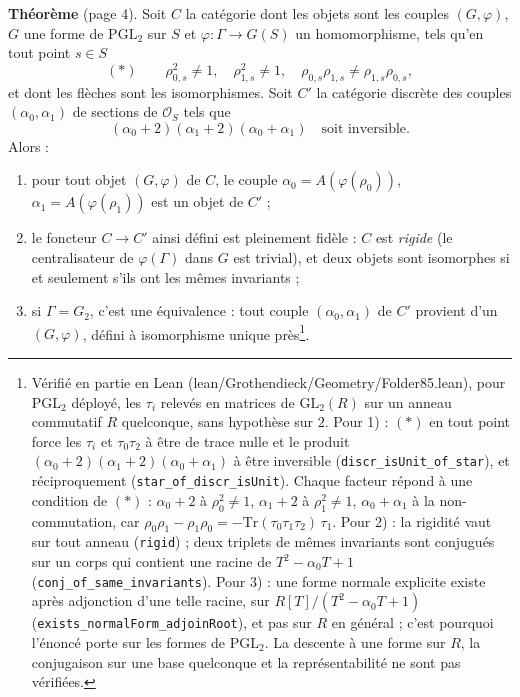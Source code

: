 \documentclass[11pt,a4paper]{article}
\begin{document}
\textbf{Théorème} (page 4). Soit $C$ la catégorie dont les objets sont les
couples $(G, \varphi)$, $G$ une forme de $\mathrm{PGL}_2$ sur $S$ et $\varphi
: \Gamma \to G(S)$ un homomorphisme, tels qu'en tout point $s \in S$
\[
  (*) \qquad \rho_{0,s}^2 \neq 1, \quad \rho_{1,s}^2 \neq 1, \quad
  \rho_{0,s}\rho_{1,s} \neq \rho_{1,s}\rho_{0,s},
\]
et dont les flèches sont les isomorphismes. Soit $C'$ la catégorie discrète
des couples $(\alpha_0, \alpha_1)$ de sections de $\mathcal{O}_S$ tels que
\[
  (\alpha_0 + 2)(\alpha_1 + 2)(\alpha_0 + \alpha_1) \quad \text{soit
  inversible.}
\]
Alors :
\begin{enumerate}
  \item pour tout objet $(G, \varphi)$ de $C$, le couple $\alpha_0 =
    A(\varphi(\rho_0))$, $\alpha_1 = A(\varphi(\rho_1))$ est un objet de $C'$ ;
  \item le foncteur $C \to C'$ ainsi défini est pleinement fidèle : $C$ est
    \emph{rigide} (le centralisateur de $\varphi(\Gamma)$ dans $G$ est
    trivial), et deux objets sont isomorphes si et seulement s'ils ont les
    mêmes invariants ;
  \item si $\Gamma = G_2$, c'est une équivalence : tout couple $(\alpha_0,
    \alpha_1)$ de $C'$ provient d'un $(G, \varphi)$, défini à isomorphisme
    unique près\footnote{Vérifié en partie en Lean
    (lean/Grothendieck/Geometry/Folder85.lean), pour $\mathrm{PGL}_2$ déployé, les
    $\tau_i$ relevés en matrices de $\mathrm{GL}_2(R)$ sur un anneau
    commutatif $R$ quelconque, sans hypothèse sur $2$. Pour 1) :
    $(*)$ en tout point force les $\tau_i$ et $\tau_0\tau_2$ à être de
    trace nulle et le produit $(\alpha_0 + 2)(\alpha_1 + 2)(\alpha_0 +
    \alpha_1)$ à être inversible (\texttt{discr\_isUnit\_of\_star}), et
    réciproquement (\texttt{star\_of\_discr\_isUnit}). Chaque facteur
    répond à une condition de $(*)$ : $\alpha_0 + 2$ à $\rho_0^2 \neq 1$,
    $\alpha_1 + 2$ à $\rho_1^2 \neq 1$, $\alpha_0 + \alpha_1$ à la
    non-commutation, car $\rho_0\rho_1 - \rho_1\rho_0 = -\mathrm{Tr}(\tau_0
    \tau_1\tau_2)\,\tau_1$. Pour 2) : la rigidité vaut sur tout anneau
    (\texttt{rigid}) ; deux triplets de mêmes invariants sont conjugués
    sur un corps qui contient une racine de $T^2 - \alpha_0 T + 1$
    (\texttt{conj\_of\_same\_invariants}). Pour 3) : une forme normale
    explicite existe après adjonction d'une telle racine, sur $R[T]/(T^2 -
    \alpha_0 T + 1)$ (\texttt{exists\_normalForm\_adjoinRoot}), et pas sur
    $R$ en général ; c'est pourquoi l'énoncé porte sur les formes de
    $\mathrm{PGL}_2$. La descente à une forme sur $R$, la conjugaison sur
    une base quelconque et la représentabilité ne sont pas vérifiées.}.
\end{enumerate}
\end{document}
